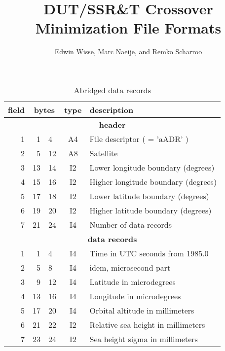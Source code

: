 \title{DUT/SSR\&T Crossover Minimization File Formats}
\author{Edwin Wisse, Marc Naeije, and Remko Scharroo}

\maketitle

\begin{table}
\caption{Abridged data records}
\medskip
\begin{tabular}{|rr@{--}lc|p{}|}
\hline
field&\multicolumn{2}{c}{bytes}&type&description \\
\hline
\multicolumn{5}{c}{\bf header} \\
\hline
 1 & 1 & 4 & A4 & File descriptor ( = 'aADR' ) \\
 2 & 5 &12 & A8 & Satellite \\
 3 &13 &14 & I2 & Lower longitude boundary (degrees) \\
 4 &15 &16 & I2 & Higher longitude boundary (degrees) \\
 5 &17 &18 & I2 & Lower latitude boundary (degrees) \\
 6 &19 &20 & I2 & Higher latitude boundary (degrees) \\
 7 &21 &24 & I4 & Number of data records \\
\hline
\multicolumn{5}{c}{\bf data records} \\
\hline
 1 & 1 & 4 & I4 & Time in UTC seconds from 1985.0 \\
 2 & 5 & 8 & I4 & idem, microsecond part \\
 3 & 9 &12 & I4 & Latitude in microdegrees \\
 4 &13 &16 & I4 & Longitude in microdegrees \\
 5 &17 &20 & I4 & Orbital altitude in millimeters \\
 6 &21 &22 & I2 & Relative sea height in millimeters \\
 7 &23 &24 & I2 & Sea height sigma in millimeters \\
\hline
\end{tabular}
\end{table}

